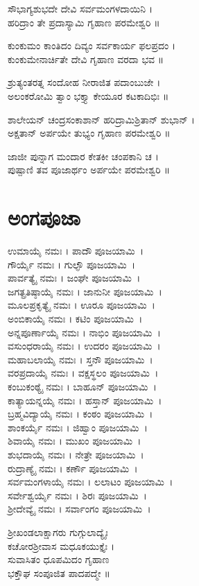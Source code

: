 ಸೌಭಾಗ್ಯಶುಭದೇ ದೇವಿ ಸರ್ವಮಂಗಳದಾಯಿನಿ ।\\
ಹರಿದ್ರಾಂ ತೇ ಪ್ರದಾಸ್ಯಾಮಿ ಗೃಹಾಣ ಪರಮೇಶ್ವರಿ ॥

ಕುಂಕುಮಂ ಕಾಂತಿದಂ ದಿವ್ಯಂ ಸರ್ವಕಾರ್ಯ ಫಲಪ್ರದಂ ।\\
ಕುಂಕುಮೇನಾರ್ಚಿತೇ ದೇವಿ ಗೃಹಾಣ ವರದಾ ಭವ ॥

ಶ್ರುತ್ಯಂತರತ್ನ ಸಂದೋಹ ನೀರಾಜಿತ ಪದಾಂಬುಜೇ ।\\
ಅಲಂಕರೋಮಿ ತ್ವಾಂ ಭಕ್ತ್ಯಾ ಕೇಯೂರ ಕಟಕಾದಿಭಿಃ ॥

ಶಾಲೇಯನ್ ಚಂದ್ರಸಂಕಾಶಾನ್ ಹರಿದ್ರಾಮಿಶ್ರಿತಾನ್ ಶುಭಾನ್ ।\\
ಅಕ್ಷತಾನ್ ಅರ್ಪಯೇ ತುಭ್ಯಂ ಗೃಹಾಣ ಪರಮೇಶ್ವರಿ ॥

ಜಾಜೀ ಪುನ್ನಾಗ ಮಂದಾರ ಕೇತಕೀ ಚಂಪಕಾನಿ ಚ ।\\
ಪುಷ್ಪಾಣಿ ತವ ಪೂಜಾರ್ಥಂ ಅರ್ಪಯೇ ಪರಮೇಶ್ವರಿ ॥

\section{ಅಂಗಪೂಜಾ}
ಉಮಾಯೈ ನಮಃ । ಪಾದೌ ಪೂಜಯಾಮಿ~।\\
ಗೌರ್ಯೈ ನಮಃ । ಗುಲ್ಫೌ ಪೂಜಯಾಮಿ~।\\
ಪಾರ್ವತ್ಯೈ ನಮಃ । ಜಂಘೇ ಪೂಜಯಾಮಿ~।\\
ಜಗತ್ಪ್ರತಿಷ್ಠಾಯೈ ನಮಃ । ಜಾನುನೀ ಪೂಜಯಾಮಿ~।\\
ಮೂಲಪ್ರಕೃತ್ಯೈ ನಮಃ । ಊರೂ ಪೂಜಯಾಮಿ~।\\
ಅಂಬಿಕಾಯೈ ನಮಃ । ಕಟಿಂ ಪೂಜಯಾಮಿ~।\\
ಅನ್ನಪೂರ್ಣಾಯೈ ನಮಃ । ನಾಭಿಂ ಪೂಜಯಾಮಿ~।\\
ವಸುಂಧರಾಯೈ ನಮಃ । ಉದರಂ ಪೂಜಯಾಮಿ~।\\
ಮಹಾಬಲಾಯೈ ನಮಃ । ಸ್ತನೌ ಪೂಜಯಾಮಿ~।\\
ವರಪ್ರದಾಯೈ ನಮಃ । ವಕ್ಷಸ್ಥಲಂ ಪೂಜಯಾಮಿ~।\\
ಕಂಬುಕಂಠ್ಯೈ ನಮಃ । ಬಾಹೂನ್ ಪೂಜಯಾಮಿ~।\\
ಕಾತ್ಯಾಯನ್ನಯೈ ನಮಃ । ಹಸ್ತಾನ್ ಪೂಜಯಾಮಿ~।\\
ಬ್ರಹ್ಮವಿದ್ಯಾಯೈ ನಮಃ । ಕಂಠಂ ಪೂಜಯಾಮಿ~।\\
ಶಾಂಕರ್ಯೈ ನಮಃ । ಜಿಹ್ವಾಂ ಪೂಜಯಾಮಿ~।\\
ಶಿವಾಯೈ ನಮಃ । ಮುಖಂ ಪೂಜಯಾಮಿ~।\\
ಶುಭದಾಯೈ ನಮಃ । ನೇತ್ರೇ ಪೂಜಯಾಮಿ~।\\
ರುದ್ರಾಣ್ಯೈ ನಮಃ । ಕರ್ಣೌ ಪೂಜಯಾಮಿ~।\\
ಸರ್ವಮಂಗಳಾಯೈ ನಮಃ । ಲಲಾಟಂ ಪೂಜಯಾಮಿ~।\\
ಸರ್ವೇಶ್ವರ್ಯೈ ನಮಃ । ಶಿರಃ ಪೂಜಯಾಮಿ~।\\
ಶ್ರೀದೇವ್ಯೈ ನಮಃ । ಸರ್ವಾಂಗಂ ಪೂಜಯಾಮಿ~।

ಶ್ರೀಖಂಡಲಾಕ್ಷಾಗರು ಗುಗ್ಗುಲಾದ್ಯೈಃ \\
ಕಚೋರಶ್ರೀವಾಸ ಮಧೂಕಯುಕ್ತೈಃ ।\\
ಸುವಾಸಿತಂ ಧೂಪಮಿದಂ ಗೃಹಾಣ \\
ಭಕ್ತೌಘ ಸಂಪೂಜಿತ ಪಾದಪದ್ಮೇ ॥

